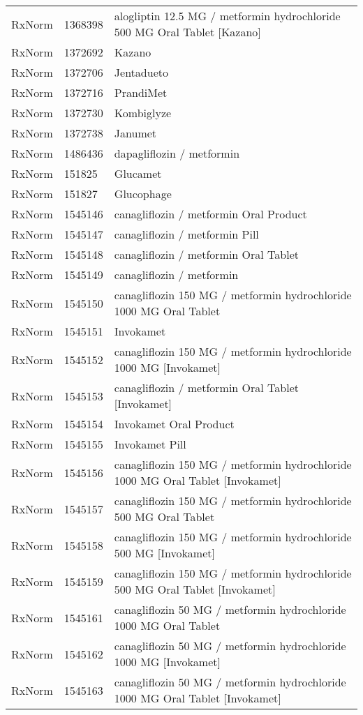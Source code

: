 \begin{longtable}{p{}p{}p{}}
  RxNorm & 1368398 & alogliptin 12.5 MG / metformin hydrochloride 500 MG Oral Tablet [Kazano] \\ 
  RxNorm & 1372692 & Kazano \\ 
  RxNorm & 1372706 & Jentadueto \\ 
  RxNorm & 1372716 & PrandiMet \\ 
  RxNorm & 1372730 & Kombiglyze \\ 
  RxNorm & 1372738 & Janumet \\ 
  RxNorm & 1486436 & dapagliflozin / metformin \\ 
  RxNorm & 151825 & Glucamet \\ 
  RxNorm & 151827 & Glucophage \\ 
  RxNorm & 1545146 & canagliflozin / metformin Oral Product \\ 
  RxNorm & 1545147 & canagliflozin / metformin Pill \\ 
  RxNorm & 1545148 & canagliflozin / metformin Oral Tablet \\ 
  RxNorm & 1545149 & canagliflozin / metformin \\ 
  RxNorm & 1545150 & canagliflozin 150 MG / metformin hydrochloride 1000 MG Oral Tablet \\ 
  RxNorm & 1545151 & Invokamet \\ 
  RxNorm & 1545152 & canagliflozin 150 MG / metformin hydrochloride 1000 MG [Invokamet] \\ 
  RxNorm & 1545153 & canagliflozin / metformin Oral Tablet [Invokamet] \\ 
  RxNorm & 1545154 & Invokamet Oral Product \\ 
  RxNorm & 1545155 & Invokamet Pill \\ 
  RxNorm & 1545156 & canagliflozin 150 MG / metformin hydrochloride 1000 MG Oral Tablet [Invokamet] \\ 
  RxNorm & 1545157 & canagliflozin 150 MG / metformin hydrochloride 500 MG Oral Tablet \\ 
  RxNorm & 1545158 & canagliflozin 150 MG / metformin hydrochloride 500 MG [Invokamet] \\ 
  RxNorm & 1545159 & canagliflozin 150 MG / metformin hydrochloride 500 MG Oral Tablet [Invokamet] \\ 
  RxNorm & 1545161 & canagliflozin 50 MG / metformin hydrochloride 1000 MG Oral Tablet \\ 
  RxNorm & 1545162 & canagliflozin 50 MG / metformin hydrochloride 1000 MG [Invokamet] \\ 
  RxNorm & 1545163 & canagliflozin 50 MG / metformin hydrochloride 1000 MG Oral Tablet [Invokamet] \\ 

\end{longtable}
